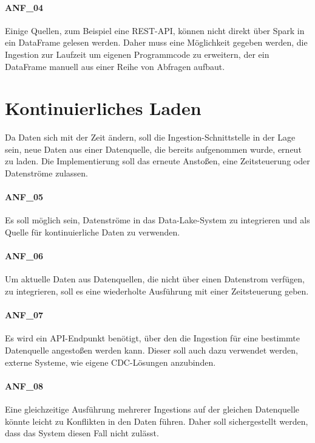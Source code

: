 \paragraph{ANF\_04}
\label{ANF_04}
Einige Quellen, zum Beispiel eine REST-API, können nicht direkt über Spark in ein DataFrame gelesen werden.
Daher muss eine Möglichkeit gegeben werden, die Ingestion zur Laufzeit um eigenen Programmcode zu erweitern, der ein DataFrame manuell aus einer Reihe von Abfragen aufbaut.

\section{Kontinuierliches Laden}
\label{sec:anf-ci}
Da Daten sich mit der Zeit ändern, soll die Ingestion-Schnittstelle in der Lage sein, neue Daten aus einer Datenquelle, die bereits aufgenommen wurde, erneut zu laden.
Die Implementierung soll das erneute Anstoßen, eine Zeitsteuerung oder Datenströme zulassen.

\paragraph{ANF\_05}
\label{ANF_05}
Es soll möglich sein, Datenströme in das Data-Lake-System zu integrieren und als Quelle für kontinuierliche Daten zu verwenden.

\paragraph{ANF\_06}
\label{ANF_06}
Um aktuelle Daten aus Datenquellen, die nicht über einen Datenstrom verfügen, zu integrieren, soll es eine  wiederholte Ausführung mit einer Zeitsteuerung geben.

\paragraph{ANF\_07}
\label{ANF_07}
Es wird ein API-Endpunkt benötigt, über den die Ingestion für eine bestimmte Datenquelle angestoßen werden kann.
Dieser soll auch dazu verwendet werden, externe Systeme, wie eigene CDC-Lösungen anzubinden.

\paragraph{ANF\_08}
\label{ANF_08}
Eine gleichzeitige Ausführung mehrerer Ingestions auf der gleichen Datenquelle könnte leicht zu Konflikten in den Daten führen.
Daher soll sichergestellt werden, dass das System diesen Fall nicht zulässt.


